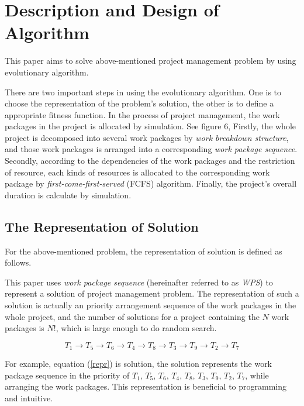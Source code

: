 %
%

\section{Description and Design of Algorithm}
%
This paper aims to solve above-mentioned project management problem by using
evolutionary algorithm.


There are two important steps in using the evolutionary algorithm. One is to
choose the representation of the problem's solution, the other is to define a
appropriate fitness function. In the process of project management, the work
packages in the project is allocated by simulation. See figure 6, Firstly, the
whole project is decomposed into several work packages by \emph{work breakdown
  structure}, and those work packages is arranged into a corresponding
\emph{work package sequence}. Secondly, according to the dependencies of the
work packages and the restriction of resource, each kinds of resources is
allocated to the corresponding work package by \emph{first-come-first-served}
(FCFS) algorithm. Finally, the project's overall duration is calculate by
simulation.


\subsection{The Representation of Solution}
%
For the above-mentioned problem, the representation of solution is defined as
follows.


This paper uses \emph{work package sequence} (hereinafter referred to as \emph{WPS}) to
represent a solution of project management problem. The representation of such a
solution is actually an priority arrangement sequence of the work packages in
the whole project, and the number of solutions for a project containing the $N$
work packages is $N!$, which is large enough to do random search.

\begin{equation}
  T_1 \rightarrow T_5 \rightarrow T_6 \rightarrow T_4 \rightarrow T_8
  \rightarrow T_3 \rightarrow T_9 \rightarrow T_2 \rightarrow T_7
  \label{repr}
\end{equation}

For example, equation (\ref{repr}) is solution, the solution represents the work
package sequence in the priority of $T_1$, $T_5$, $T_6$, $T_4$, $T_8$, $T_3$,
$T_9$, $T_2$, $T_7$, while arranging the work packages. This representation is
beneficial to programming and intuitive.


